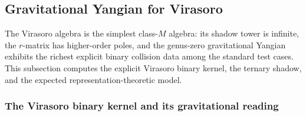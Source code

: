 %
%

\subsection{Gravitational Yangian for Virasoro}

The Virasoro algebra is the simplest class-$M$ algebra: its shadow
tower is infinite, the $r$-matrix has higher-order poles, and the
genus-zero gravitational Yangian exhibits the richest explicit binary
collision data among the standard test cases. This subsection
computes the explicit Virasoro binary kernel, the ternary shadow,
and the expected representation-theoretic model.


\subsubsection{The Virasoro binary kernel and its gravitational reading}

